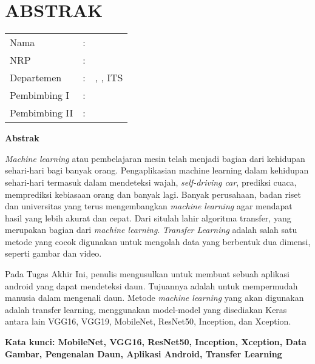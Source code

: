 \chapter {ABSTRAK}


\noindent\textbf{\MakeUppercase\judul}
\vspace*{1em}

\begin{tabularx}{\linewidth}{ l l X }
	Nama 			& : & \penulis \\
	NRP 			& :	& \nrp \\
	Departemen 		& : & \jurusan, \newline \fakultas, ITS \\
	Pembimbing I 	& : & \pembimbingsatu \\
	Pembimbing II 	& : & \pembimbingdua
	\vspace*{1em} 	%
\end {tabularx}

\noindent\textbf{Abstrak} \\
\itshape
\par \textit{Machine learning} atau pembelajaran mesin telah menjadi bagian dari kehidupan sehari-hari bagi banyak orang. Pengaplikasian machine learning dalam kehidupan sehari-hari termasuk dalam mendeteksi wajah, \textit{self-driving car}, prediksi cuaca, memprediksi kebiasaan orang dan banyak lagi. Banyak perusahaan, badan riset dan universitas yang terus mengembangkan \textit{machine learning} agar mendapat hasil yang lebih akurat dan cepat. Dari situlah lahir algoritma transfer, yang merupakan bagian dari \textit{machine learning}. \textit{Transfer Learning} adalah salah satu metode yang cocok digunakan untuk mengolah data yang berbentuk dua dimensi, seperti gambar dan video. 

\par Pada Tugas Akhir Ini, penulis mengusulkan untuk membuat sebuah aplikasi android yang dapat mendeteksi daun. Tujuannya adalah untuk mempermudah manusia dalam mengenali daun. Metode \textit{machine learning} yang akan digunakan adalah transfer learning, menggunakan model-model yang disediakan Keras antara lain VGG16, VGG19, MobileNet, ResNet50, Inception, dan Xception.

\vspace*{1em}
\noindent\bfseries Kata kunci: MobileNet, VGG16, ResNet50, Inception, Xception, Data Gambar, Pengenalan Daun, Aplikasi Android, Transfer Learning
\normalfont
\cleardoublepage

